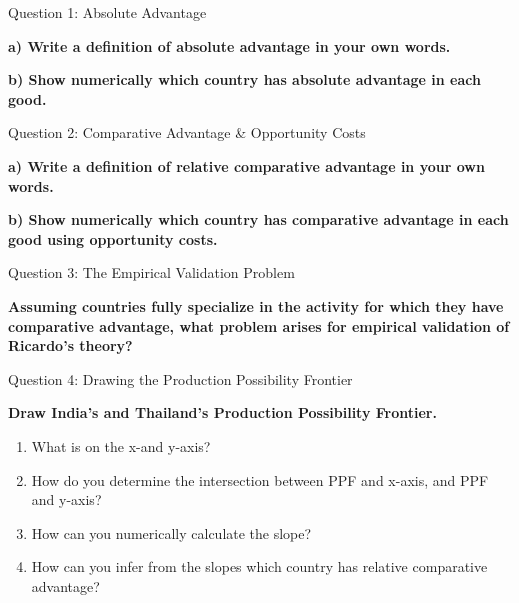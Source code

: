 \documentclass{beamer}
\begin{document}

\begin{frame}{Question 1: Absolute Advantage}

\textbf{a) Write a definition of absolute advantage in your own words.}

\vspace{1cm}

\textbf{b) Show numerically which country has absolute advantage in each good.}

\end{frame}



\begin{frame}{Question 2: Comparative Advantage \& Opportunity Costs}

\textbf{a) Write a definition of relative comparative advantage in your own words.}

\vspace{0.5cm}

\textbf{b) Show numerically which country has comparative advantage in each good using opportunity costs.}

\end{frame}



\begin{frame}{Question 3: The Empirical Validation Problem}

\textbf{Assuming countries fully specialize in the activity for which they have comparative advantage, what problem arises for empirical validation of Ricardo's theory?}

\end{frame}



\begin{frame}{Question 4: Drawing the Production Possibility Frontier}

\vspace{-0.2cm}

\textbf{Draw India's and Thailand's Production Possibility Frontier.}

\vspace{0.2cm}

\begin{enumerate}
    \item What is on the x-and y-axis?
    \item How do you determine the intersection between PPF and x-axis, and PPF and y-axis?
    \item How can you numerically calculate the slope?
    \item How can you infer from the slopes which country has relative comparative advantage?
\end{enumerate}

\end{frame}
\end{document}
